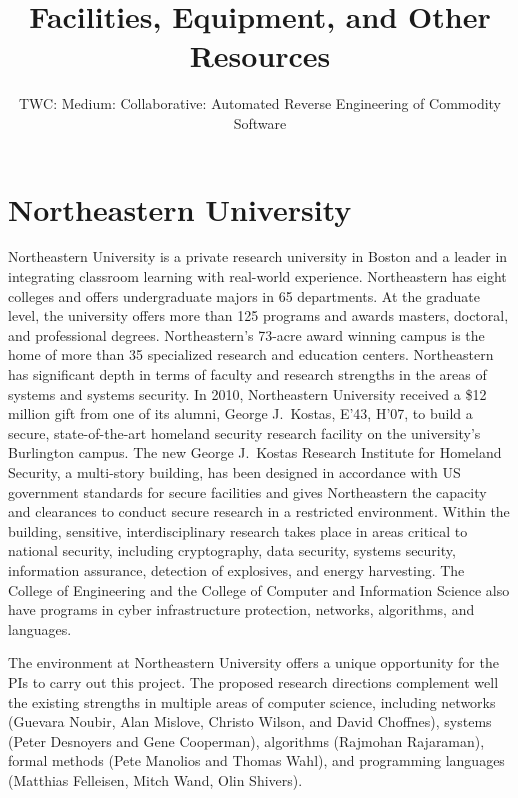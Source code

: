 \documentclass[letterpaper,11pt]{scrartcl}
\newcommand{\thetitle}{TWC: Medium: Collaborative: Automated Reverse Engineering of Commodity Software\xspace}
\begin{document}

\title{Facilities, Equipment, and Other Resources}
\subtitle{\thetitle}
\author{}
\date{}
\maketitle

\section*{Northeastern University}

Northeastern University is a private research university in Boston and a
leader in integrating classroom learning with real-world experience.
Northeastern has eight colleges and offers undergraduate majors in 65
departments. At the graduate level, the university offers more than 125
programs and awards masters, doctoral, and professional degrees.
Northeastern's 73-acre award winning campus is the home of more than 35
specialized research and education centers.  Northeastern has significant
depth in terms of faculty and research strengths in the areas of systems and
systems security. In 2010, Northeastern University received a \$12 million
gift from one of its alumni, George J.~Kostas, E'43, H'07, to build a secure,
state-of-the-art homeland security research facility on the university's
Burlington campus. The new George J.~Kostas Research Institute for Homeland
Security, a multi-story building, has been designed in accordance with US
government standards for secure facilities and gives Northeastern the capacity
and clearances to conduct secure research in a restricted environment. Within
the building, sensitive, interdisciplinary research takes place in areas
critical to national security, including cryptography, data security, systems
security, information assurance, detection of explosives, and energy
harvesting.  The College of Engineering and the College of Computer and
Information Science also have programs in cyber infrastructure protection,
networks, algorithms, and languages.

The environment at Northeastern University offers a unique opportunity for the
PIs to carry out this project.  The proposed research directions complement
well the existing strengths in multiple areas of computer science, including
networks (Guevara Noubir, Alan Mislove, Christo Wilson, and David Choffnes),
systems (Peter Desnoyers and Gene Cooperman), algorithms (Rajmohan Rajaraman),
formal methods (Pete Manolios and Thomas Wahl), and programming languages
(Matthias Felleisen, Mitch Wand, Olin Shivers).
\end{document}
